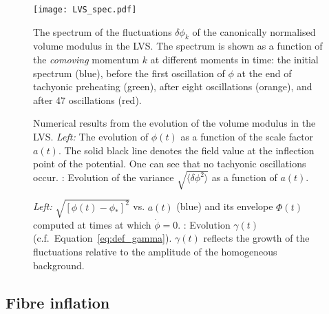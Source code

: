 \documentclass[12pt]{article}
\begin{document}
\begin{figure}
\centering
\texttt{[image: LVS\_spec.pdf]}
\caption{The spectrum of the fluctuations $\delta\phi_k$ of the canonically normalised volume modulus in the LVS. The spectrum is shown as a function of the \textit{comoving} momentum $k$ at different moments in time: the initial spectrum (blue), before the first oscillation of $\phi$ at the end of tachyonic preheating (green), after eight oscillations (orange), and after 47 oscillations (red). }
\label{fig:LVS_spec}
\end{figure}

\begin{figure}
\centering
{}
\hfill
{}
\caption{Numerical results from the evolution of the volume modulus in the LVS. \textit{Left:} The evolution of $\phi(t)$ as a function of the scale factor $a(t)$. The solid black line denotes the field value at the inflection point of the potential. One can see that no tachyonic oscillations occur. : Evolution of the variance $\sqrt{\langle\delta\phi^2\rangle}$ as a function of $a(t)$.}
\label{fig:LVS_hom_var}
\end{figure}

\begin{figure}
\centering
{}
\hfill
{}
\caption{\textit{Left:} $\sqrt{[\phi(t)-\phi_*]^2}$ vs. $a(t)$ (blue) and its envelope $\Phi(t)$ computed at times at which $\dot{\phi}=0$. : Evolution $\gamma(t)$ (c.f.\ Equation~\eqref{eq:def_gamma}). $\gamma(t)$ reflects the growth of the fluctuations relative to the amplitude of the homogeneous background.}
\label{fig:LVS_gamma}
\end{figure}





\subsection{Fibre inflation}
\label{sec:fibre inflation}
\end{document}
